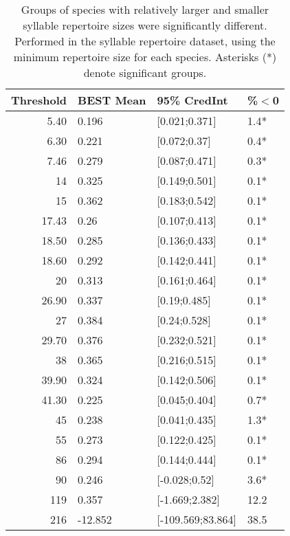 \documentclass{article}
\begin{document}
  \begin{table}[H]
  \centering
  \caption{Groups of species with relatively larger and smaller syllable repertoire sizes were
  significantly different. Performed in the syllable repertoire dataset, using the minimum repertoire size for each species. Asterisks (*) denote significant groups.} 
  \begin{tabular}{rlll}
  \hline
  Threshold & BEST Mean & 95\% CredInt & \%$<$0 \\ 
  \hline
  5.40 & 0.196 & [0.021;0.371] & 1.4* \\ 
  6.30 & 0.221 & [0.072;0.37] & 0.4* \\ 
  7.46 & 0.279 & [0.087;0.471] & 0.3* \\ 
  14 & 0.325 & [0.149;0.501] & 0.1* \\ 
  15 & 0.362 & [0.183;0.542] & 0.1* \\ 
  17.43 & 0.26 & [0.107;0.413] & 0.1* \\ 
  18.50 & 0.285 & [0.136;0.433] & 0.1* \\ 
  18.60 & 0.292 & [0.142;0.441] & 0.1* \\ 
  20 & 0.313 & [0.161;0.464] & 0.1* \\ 
  26.90 & 0.337 & [0.19;0.485] & 0.1* \\ 
  27 & 0.384 & [0.24;0.528] & 0.1* \\ 
  29.70 & 0.376 & [0.232;0.521] & 0.1* \\ 
  38 & 0.365 & [0.216;0.515] & 0.1* \\ 
  39.90 & 0.324 & [0.142;0.506] & 0.1* \\ 
  41.30 & 0.225 & [0.045;0.404] & 0.7* \\ 
  45 & 0.238 & [0.041;0.435] & 1.3* \\ 
  55 & 0.273 & [0.122;0.425] & 0.1* \\ 
  86 & 0.294 & [0.144;0.444] & 0.1* \\ 
  90 & 0.246 & [-0.028;0.52] & 3.6* \\ 
  119 & 0.357 & [-1.669;2.382] & 12.2 \\ 
  216 & -12.852 & [-109.569;83.864] & 38.5 \\ 
  \hline
  \end{tabular}
  \end{table}
  
  
  
\end{document}
